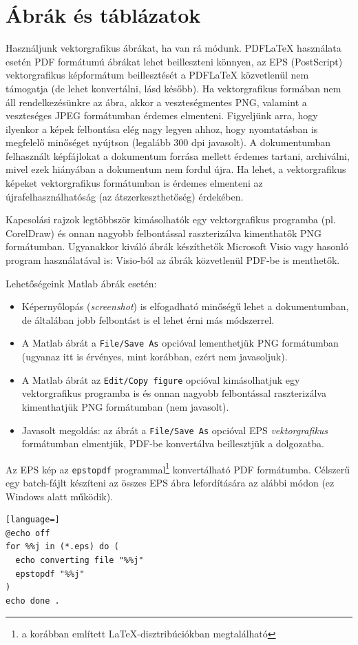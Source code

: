 \section{Ábrák és táblázatok}
Használjunk vektorgrafikus ábrákat, ha van rá módunk. PDFLaTeX használata esetén PDF formátumú ábrákat lehet beilleszteni könnyen, az EPS (PostScript) vektorgrafikus képformátum beillesztését a PDFLaTeX közvetlenül nem támogatja (de lehet konvertálni, lásd később). Ha vektorgrafikus formában nem áll rendelkezésünkre az ábra, akkor a  veszteségmentes PNG, valamint a veszteséges JPEG formátumban érdemes elmenteni.  Figyeljünk arra, hogy ilyenkor a képek felbontása elég nagy legyen ahhoz, hogy nyomtatásban is megfelelő minőséget nyújtson (legalább 300 dpi javasolt). A dokumentumban felhasznált képfájlokat a dokumentum forrása mellett érdemes tartani, archiválni, mivel ezek hiányában a dokumentum nem fordul újra. Ha lehet, a vektorgrafikus képeket vektorgrafikus formátumban is érdemes elmenteni az újrafelhasználhatóság (az átszerkeszthetőség) érdekében.

Kapcsolási rajzok legtöbbször kimásolhatók egy vektorgrafikus programba (pl. CorelDraw) és onnan nagyobb felbontással raszterizálva kimenthatők PNG formátumban. Ugyanakkor kiváló ábrák készíthetők Microsoft Visio vagy hasonló program használatával is: Visio-ból az ábrák közvetlenül PDF-be is menthetők.

Lehetőségeink Matlab ábrák esetén:
\begin{itemize}
	\item Képernyőlopás (\emph{screenshot}) is elfogadható minőségű lehet a dokumentumban, de általában jobb felbontást is el lehet érni más módszerrel.
	\item A Matlab ábrát a \verb+File/Save As+ opcióval lementhetjük PNG formátumban (ugyanaz itt is érvényes, mint korábban, ezért nem javasoljuk).
	\item A Matlab ábrát az \verb+Edit/Copy figure+ opcióval kimásolhatjuk egy vektorgrafikus programba is és onnan nagyobb felbontással raszterizálva kimenthatjük PNG formátumban (nem javasolt).
	\item Javasolt megoldás: az ábrát a \verb+File/Save As+ opcióval EPS \emph{vektorgrafikus} formátumban elmentjük, PDF-be konvertálva beillesztjük a dolgozatba.
\end{itemize}
Az EPS kép az \verb+epstopdf+ programmal\footnote{a korábban említett \LaTeX-disztribúciókban megtalálható} konvertálható PDF formátumba. Célszerű egy batch-fájlt készíteni az összes EPS ábra lefordítására az alábbi módon (ez Windows alatt működik).
\begin{lstlisting}[language=]
@echo off
for %%j in (*.eps) do (
  echo converting file "%%j"
  epstopdf "%%j"
)
echo done .
\end{lstlisting}


